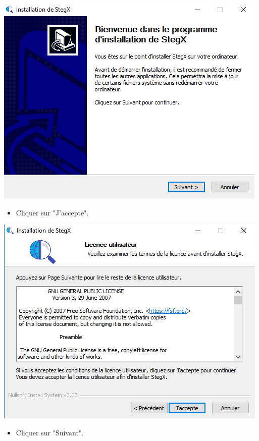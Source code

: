 \documentclass[11pt]{article}
\begin{document}
\hspace{1cm}
\includegraphics[scale=1]{pictures/presentation.png}
\vspace{1cm}

\begin{itemize}
\item Cliquer sur "J'accepte". 
\end{itemize}

\hspace{1cm}
\includegraphics[scale=1]{pictures/licence.png}
\vspace{1cm}

\begin{itemize}
\item Cliquer sur "Suivant". 
\end{itemize}
\end{document}
